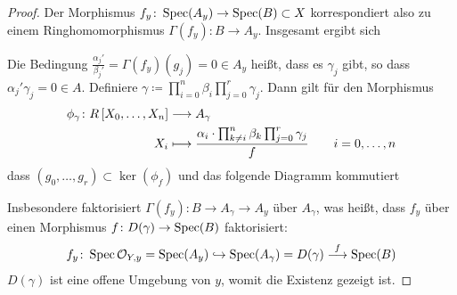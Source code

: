 \begin{Lemma}
\begin{proof}
    Der Morphismus ${f_y\colon\operatorname{Spec}(A_y)\to\operatorname{Spec}(B)\subset X}$
    korrespondiert also zu einem Ringhomomorphismus
    ${\Gamma(f_y)\colon B\to A_y}$.
    Insgesamt ergibt sich
    \begin{center}
    \end{center}
    Die Bedingung $\frac{\alpha_j'}{\beta_j'}=\Gamma(f_y)(g_j)=0\in A_y$
    heißt, dass es $\gamma_j$ gibt, so dass
    $\alpha_j'\gamma_j=0\in A$.
    Definiere
    $\gamma\coloneqq \prod_{i=0}^n \beta_i \prod_{j=0}^r \gamma_j$.
    Dann gilt für den Morphismus
    \begin{align*}
      \phi_\gamma\colon
      R\left[X_0,\dotsc, X_n\right]
      &\longrightarrow
        A_\gamma\\
      X_i
      &\longmapsto
        \dfrac{
        \alpha_i\cdot
        \prod_{k\neq i}^n \beta_k
        \prod_{j=0}^r \gamma_j
        }{f}
        \qquad i=0,\dotsc,n
    \end{align*}
    dass $(g_0, \dotsc, g_r)\subset\ker(\phi_f)$ und das folgende
    Diagramm kommutiert
    \begin{center}
    \end{center}
    Insbesondere faktorisiert ${\Gamma(f_y)\colon B\to A_\gamma\to A_y}$
    über $A_\gamma$, was heißt, dass $f_y$ über einen Morphismus
    ${f\colon D(\gamma)\to\operatorname{Spec}(B)}$ faktorisiert:
    \begin{gather*}
      f_y\colon
      \operatorname{Spec}\mathcal{O}_{Y,y}=\operatorname{Spec}(A_y)
      \hookrightarrow \operatorname{Spec}(A_\gamma)=D(\gamma)
      \overset{f}{\longrightarrow} \operatorname{Spec}(B)
    \end{gather*}
    $D(\gamma)$ ist eine offene Umgebung von $y$, womit die Existenz
    gezeigt ist.
  \end{proof}
\end{Lemma}

